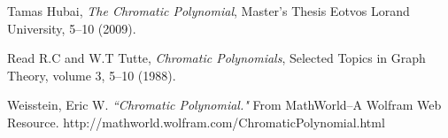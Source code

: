 \documentclass[11pt]{article}
\theoremstyle{definition}
\begin{document}
\newpage
\begin{thebibliography}{9}

Tamas Hubai, \emph{The Chromatic Polynomial}, Master's Thesis Eotvos Lorand University, 5--10 (2009).

Read R.C and W.T Tutte, \emph{Chromatic Polynomials}, Selected Topics in Graph Theory, volume 3, 5--10 (1988).

Weisstein, Eric W. \emph{``Chromatic Polynomial."} From MathWorld--A Wolfram Web Resource. http://mathworld.wolfram.com/ChromaticPolynomial.html


\end{thebibliography}
\end{document}
